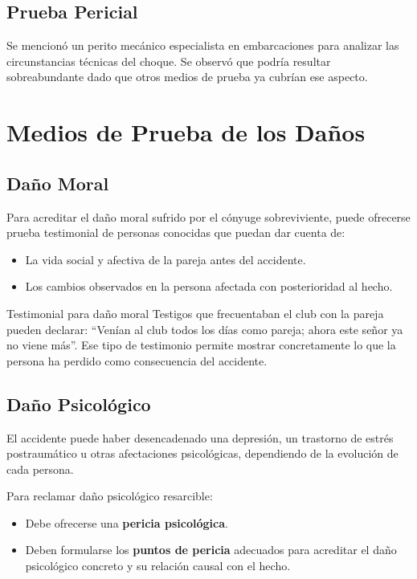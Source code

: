 \documentclass[12pt,oneside]{book}
\begin{document}
\subsection{Prueba Pericial}

Se mencionó un perito mecánico especialista en embarcaciones para analizar las circunstancias técnicas del choque. Se observó que podría resultar sobreabundante dado que otros medios de prueba ya cubrían ese aspecto.

\section{Medios de Prueba de los Daños}

\subsection{Daño Moral}

Para acreditar el daño moral sufrido por el cónyuge sobreviviente, puede ofrecerse prueba testimonial de personas conocidas que puedan dar cuenta de:
\begin{itemize}
    \item La vida social y afectiva de la pareja antes del accidente.
    \item Los cambios observados en la persona afectada con posterioridad al hecho.
\end{itemize}

\begin{example}{Testimonial para daño moral}
Testigos que frecuentaban el club con la pareja pueden declarar: ``Venían al club todos los días como pareja; ahora este señor ya no viene más''. Ese tipo de testimonio permite mostrar concretamente lo que la persona ha perdido como consecuencia del accidente.
\end{example}

\subsection{Daño Psicológico}

El accidente puede haber desencadenado una depresión, un trastorno de estrés postraumático u otras afectaciones psicológicas, dependiendo de la evolución de cada persona.

Para reclamar daño psicológico resarcible:
\begin{itemize}
    \item Debe ofrecerse una \textbf{pericia psicológica}.
    \item Deben formularse los \textbf{puntos de pericia} adecuados para acreditar el daño psicológico concreto y su relación causal con el hecho.
\end{itemize}
\end{document}
